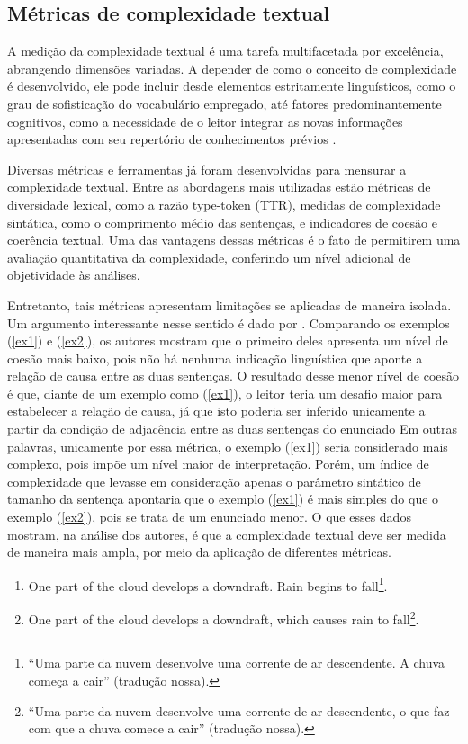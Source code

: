 \documentclass[portuguese]{textolivre}
\begin{document}
\subsection{Métricas de complexidade textual}\label{sec-métricas}
A medição da complexidade textual é uma tarefa multifacetada por excelência, abrangendo dimensões variadas.
A depender de como o conceito de complexidade é desenvolvido, ele pode incluir desde elementos estritamente linguísticos, como o grau de sofisticação do vocabulário empregado, até fatores predominantemente cognitivos, como a necessidade de o leitor integrar as novas informações apresentadas com seu repertório de conhecimentos prévios \cite{Frantz2015}.

Diversas métricas e ferramentas já foram desenvolvidas para mensurar a complexidade textual.
Entre as abordagens mais utilizadas estão métricas de diversidade lexical, como a razão type-token (TTR), medidas de complexidade sintática, como o comprimento médio das sentenças, e indicadores de coesão e coerência textual.
Uma das vantagens dessas métricas é o fato de permitirem uma avaliação quantitativa da complexidade, conferindo um nível adicional de objetividade às análises.

Entretanto, tais métricas apresentam limitações se aplicadas de maneira isolada.
Um argumento interessante nesse sentido é dado por \textcite{Mcnamara2002}.
Comparando os exemplos (\ref{ex1}) e (\ref{ex2}), os autores mostram que o primeiro deles apresenta um nível de coesão mais baixo, pois não há nenhuma indicação linguística que aponte a relação de causa entre as duas sentenças.
O resultado desse menor nível de coesão é que, diante de um exemplo como (\ref{ex1}), o leitor teria um desafio maior para estabelecer a relação de causa, já que isto poderia ser inferido unicamente a partir da condição de adjacência entre as duas sentenças do enunciado
Em outras palavras, unicamente por essa métrica, o exemplo (\ref{ex1}) seria considerado mais complexo, pois impõe um nível maior de interpretação.
Porém, um índice de complexidade que levasse em consideração apenas o parâmetro sintático de tamanho da sentença apontaria que o exemplo (\ref{ex1}) é mais simples do que o exemplo (\ref{ex2}), pois se trata de um enunciado menor.
O que esses dados mostram, na análise dos autores, é que a complexidade textual deve ser medida de maneira mais ampla, por meio da aplicação de diferentes métricas.

\begin{enumerate}[resume=exlist]
\item One part of the cloud develops a downdraft. Rain begins to fall\footnote{``Uma parte da nuvem desenvolve uma corrente de ar descendente. A chuva começa a cair'' (tradução nossa).}.\label{ex1}
\item One part of the cloud develops a downdraft, which causes rain to fall\footnote{``Uma parte da nuvem desenvolve uma corrente de ar descendente, o que faz com que a chuva comece a cair'' (tradução nossa).}.\label{ex2}
\end{enumerate}
\end{document}
